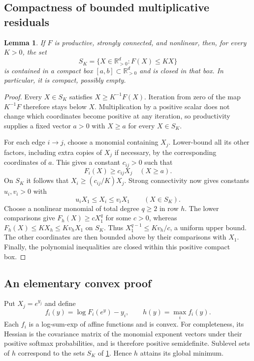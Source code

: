 \documentclass[11pt,a4paper]{article}
\newtheorem{lemma}[theorem]{Lemma}
\theoremstyle{definition}
\theoremstyle{remark}
\newcommand{\R}{\mathbb R}
\begin{document}
\subsection{Compactness of bounded multiplicative residuals}
\begin{lemma}\label{lem:compact}
If $F$ is productive, strongly connected, and nonlinear, then, for every
$K>0$, the set
\[
 S_K=\{X\in\R_{>0}^d:F(X)\leq KX\}
\]
is contained in a compact box $[a,b]\subset\R_{>0}^d$ and is closed in that
box. In particular, it is compact, possibly empty.
\end{lemma}
\begin{proof}
Every $X\in S_K$ satisfies $X\geq K^{-1}F(X)$. Iteration from zero of the
map $K^{-1}F$ therefore stays below $X$. Multiplication by a positive scalar
does not change which coordinates become positive at any iteration, so
productivity supplies a fixed vector $a>0$ with $X\geq a$ for every
$X\in S_K$.

For each edge $i\to j$, choose a monomial containing $X_j$. Lower-bound all
its other factors, including extra copies of $X_j$ if necessary, by the
corresponding coordinates of $a$. This gives a constant $c_{ij}>0$ such that
\[
 F_i(X)\geq c_{ij}X_j\quad(X\geq a).
\]
On $S_K$ it follows that $X_i\geq(c_{ij}/K)X_j$.
Strong connectivity now gives constants $u_i,v_i>0$ with
\[
 u_iX_1\leq X_i\leq v_iX_1
 \qquad(X\in S_K).
\]
Choose a nonlinear monomial of total degree $q\geq2$ in row $h$.
The lower comparisons give $F_h(X)\geq cX_1^q$ for some $c>0$,
whereas $F_h(X)\leq KX_h\leq Kv_hX_1$ on $S_K$.
Thus $X_1^{q-1}\leq Kv_h/c$, a uniform upper bound.
The other coordinates are then bounded above by their comparisons with
$X_1$. Finally, the polynomial inequalities are closed within this positive
compact box.
\end{proof}

\subsection{An elementary convex proof}
Put $X_j=e^{y_j}$ and define
\begin{equation}\label{eq:h}
 f_i(y)=\log F_i(e^y)-y_i,
 \qquad h(y)=\max_i f_i(y).
\end{equation}
Each $f_i$ is a log-sum-exp of affine functions and is convex. For
completeness, its Hessian is the covariance matrix of the monomial exponent
vectors under their positive softmax probabilities, and is therefore
positive semidefinite. Sublevel sets of $h$ correspond to the sets $S_K$ of
\cref{lem:compact}. Hence $h$ attains its global minimum.
\end{document}
